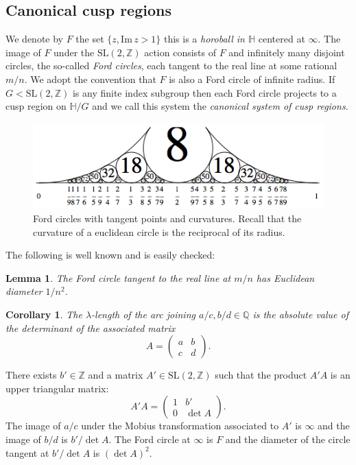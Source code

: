 \documentclass[12pt,a4paper]{amsart}
\newtheorem{coro}[thm]{Corollary}
\newtheorem{lem}[thm]{Lemma}
\def\HH{\mathbb{H}}
\def\im{\mathrm{Im}\,}
\def\ZZ{\mathbb{Z}}
\def\sl2{\mathrm{SL}(2, \ZZ)}
\begin{document}
\subsection{Canonical cusp regions}\label{canonical cusp}

We denote by $F$ the set  $\{ z, \im z > 1\}$
this is a \textit{horoball in $\HH$} centered at $\infty$.
The image of $F$ under the $\sl2$ action consists of
$F$ and infinitely many disjoint circles, the so-called \textit{Ford circles}, 
each tangent to the real line at some rational $m/n$.
We adopt the convention that $F$ is also a Ford circle of infinite radius.
If $G < \sl2$ is any finite index subgroup then 
each Ford circle projects to a cusp region on $\mathbb{H}/G$ and we
call this system  the \textit{canonical system of cusp regions}.

\begin{figure}[H]
\begin{center}
\includegraphics[scale=.8]{Ford-circles.png} 
\end{center}
\caption{Ford circles with tangent points and curvatures.
Recall that the curvature of a euclidean circle is the reciprocal of its radius.}
\end{figure}

The following is well known and is easily checked:

\begin{lem}\label{ford}
The Ford circle tangent to the real line at $m/n$
has Euclidean diameter $1/n^2$.
\end{lem}

\begin{coro}
	The $\lambda$-length of the arc joining 
	$a/c, b/d \in \mathbb{Q}$ is the absolute value of
	the determinant of the associated matrix 
	$$A= \begin{pmatrix} a& b\\c&d \end{pmatrix}.$$
\end{coro}

\proof There exists  $b'\in \mathbb{Z}$ and  a matrix $A' \in \sl2$ such that the product $A'A$
is an upper triangular matrix:
	$$A'A= \begin{pmatrix} 1& b'\\0& \det A
	\end{pmatrix}.$$
The image of $a/c$ under the Mobius transformation associated to
$A'$ is $\infty$ and the image of $b/d$ is $b'/\det A$.
The Ford circle at $\infty$ is $F$ and the 
diameter of the circle tangent at $b'/\det A$ is $(\det A)^2$.
\end{document}

